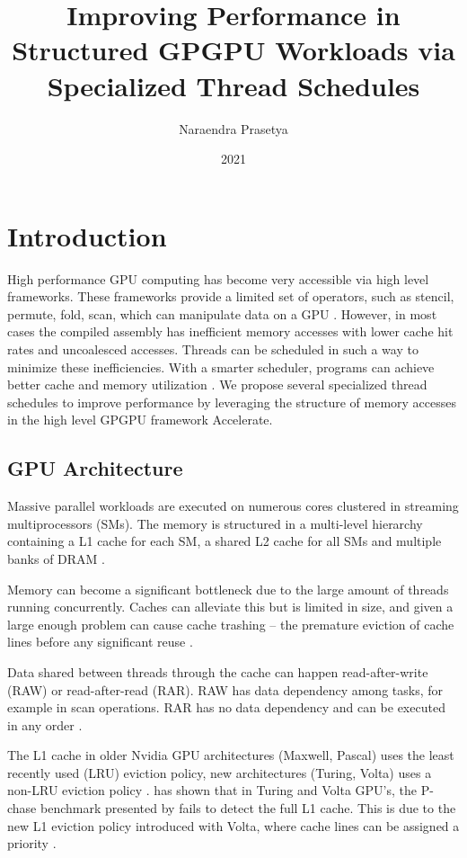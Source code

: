 \documentclass{article}
\title{Improving Performance in Structured GPGPU Workloads via Specialized Thread Schedules}
\author{Naraendra Prasetya}
\date{2021}
\begin{document}
\maketitle

\section{Introduction}    
High performance GPU computing has become very accessible via high level frameworks.
These frameworks provide a limited set of operators, such as stencil, permute, fold, scan, which can manipulate data on a GPU \cite{chakravarty2011accelerating}.
However, in most cases the compiled assembly has inefficient memory accesses with lower cache hit rates and uncoalesced accesses.
Threads can be scheduled in such a way to minimize these inefficiencies.
With a smarter scheduler, programs can achieve better cache and memory utilization \cite{nugteren2014study}.
We propose several specialized thread schedules to improve performance by leveraging the structure of memory accesses in the high level GPGPU framework Accelerate.

\subsection{GPU Architecture}
Massive parallel workloads are executed on numerous cores clustered in streaming multiprocessors (SMs).
The memory is structured in a multi-level hierarchy containing a L1 cache for each SM, a shared L2 cache for all SMs and multiple banks of DRAM \cite{nvidia2017volta,nvidia2020ampere}.

Memory can become a significant bottleneck due to the large amount of threads running concurrently.
Caches can alleviate this but is limited in size, and given a large enough problem can cause cache trashing -- the premature eviction of cache lines before any significant reuse \cite{dai2016model}.

Data shared between threads through the cache can happen read-after-write (RAW) or read-after-read (RAR).
RAW has data dependency among tasks, for example in scan operations.
RAR has no data dependency and can be executed in any order \cite{tripathy2021paver}.

The L1 cache in older Nvidia GPU architectures (Maxwell, Pascal) uses the least recently used (LRU) eviction policy, new architectures (Turing, Volta) uses a non-LRU eviction policy \cite{jia2019dissecting, jia2018dissecting,mei2016dissecting}.
\citet{jia2019dissecting} has shown that in Turing and Volta GPU's, the P-chase benchmark presented by \citet{mei2016dissecting} fails to detect the full L1 cache.
This is due to the new L1 eviction policy introduced with Volta, where cache lines can be assigned a priority \cite{jia2019dissecting,nvidia2021cudadocs}.
\end{document}
